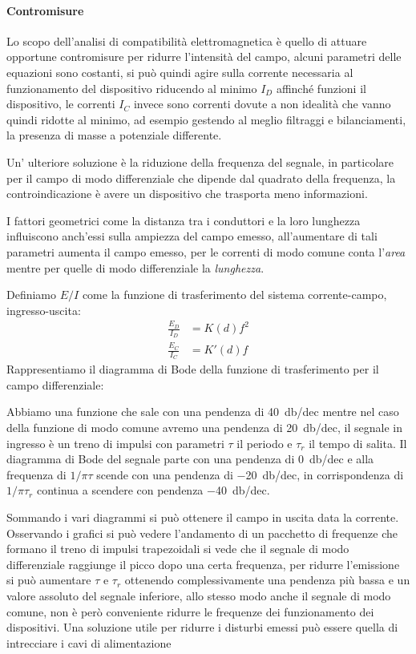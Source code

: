 \newpage

\paragraph{Contromisure}
Lo scopo dell'analisi di compatibilità elettromagnetica è quello di attuare opportune
contromisure per ridurre l'intensità del campo, alcuni parametri delle equazioni sono costanti,
si può quindi agire sulla corrente necessaria al funzionamento del dispositivo
riducendo al minimo $I_D$ affinché funzioni il dispositivo, le correnti $I_C$ invece sono correnti 
dovute a non idealità che vanno quindi ridotte al minimo, ad esempio gestendo al meglio
filtraggi e bilanciamenti, la presenza di masse a potenziale differente.

Un' ulteriore soluzione è la riduzione della frequenza del segnale, in particolare
per il campo di modo differenziale che dipende dal quadrato della frequenza,
la controindicazione è avere un dispositivo che trasporta meno informazioni.

I fattori geometrici come la distanza tra i conduttori e la loro lunghezza influiscono
anch'essi sulla ampiezza del campo emesso, all'aumentare di tali parametri aumenta il campo emesso,
per le correnti di modo comune conta l'\textit{area} mentre per quelle di modo differenziale la \textit{lunghezza}.

Definiamo $E/I$ come la funzione di trasferimento del sistema corrente-campo, ingresso-uscita:
\begin{equation*}
\begin{split}
\frac{E_D}{I_D} & = K(d)f^2 \\
\frac{E_C}{I_C} & = K'(d)f
\end{split}
\end{equation*}
Rappresentiamo il diagramma di Bode della funzione di trasferimento per il campo differenziale:


Abbiamo una funzione che sale con una pendenza di \SI{+40}{\decibel/dec} mentre nel caso della funzione
di modo comune avremo una pendenza di \SI{+20}{\decibel/dec}, il segnale in ingresso
è un treno di impulsi con parametri $\tau$ il periodo e $\tau_r$ il tempo di salita.
Il diagramma di Bode del segnale parte con una pendenza di \SI{0}{\decibel/dec} e alla frequenza di $1/\pi\tau$
scende con una pendenza di \SI{-20}{\decibel/dec}, in corrispondenza di $1/\pi\tau_r$ continua
a scendere con pendenza \SI{-40}{\decibel/dec}.

Sommando i vari diagrammi si può ottenere il campo in uscita data la corrente.
Osservando i grafici si può vedere l'andamento di un pacchetto di frequenze che formano il treno %
di impulsi trapezoidali si vede che il segnale di modo
differenziale raggiunge il picco dopo una certa frequenza, per ridurre l'emissione si può aumentare
$\tau$ e $\tau_r$ ottenendo complessivamente una pendenza più bassa e un valore assoluto del segnale
inferiore, allo stesso modo anche il segnale di modo comune, non è però conveniente ridurre le frequenze dei funzionamento dei dispositivi.
Una soluzione utile per ridurre i disturbi emessi può essere quella di intrecciare i cavi di alimentazione

